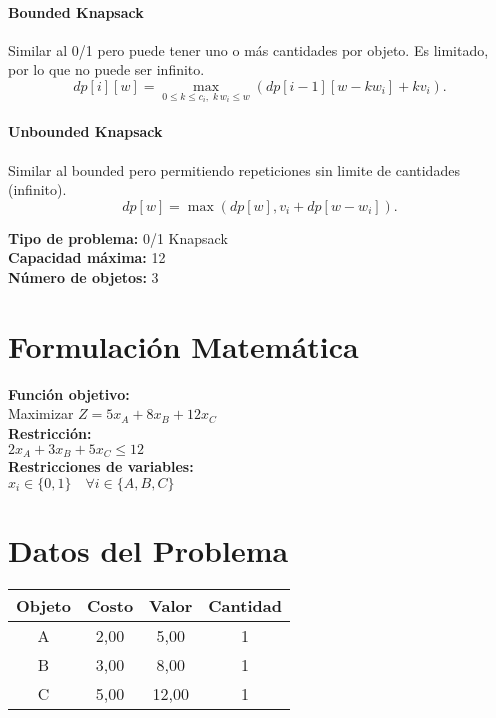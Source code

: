 \documentclass{article}
\begin{document}
\paragraph{Bounded Knapsack} Similar al 0/1 pero puede tener uno o más cantidades por objeto. Es limitado, por lo que no puede ser infinito. 
\[
dp[i][w] = 
\max_{0 \leq k \leq c_i,\; k\,w_i \leq w} \left( dp[i-1][w - k w_i] + k v_i \right).
\]

\paragraph{Unbounded Knapsack} Similar al bounded pero permitiendo repeticiones sin limite de cantidades (infinito).
\[
dp[w] = \max ( dp[w], v_i + dp[w - w_i] ).
\]

\thispagestyle{empty}
\newpage
\textbf{Tipo de problema:} 0/1 Knapsack\\
\textbf{Capacidad máxima:} 12\\
\textbf{Número de objetos:} 3\\

\section*{Formulación Matemática}
\textbf{Función objetivo:}\\
Maximizar $Z = 5 x_{A} + 8 x_{B} + 12 x_{C}$\\

\textbf{Restricción:}\\
$2 x_{A} + 3 x_{B} + 5 x_{C} \leq 12$\\

\textbf{Restricciones de variables:}\\
$x_i \in \{0, 1\} \quad \forall i \in \{A, B, C\}$\\
\vspace{0.5cm}

\section*{Datos del Problema}
\begin{tabular}{|c|c|c|c|}
\hline
Objeto & Costo & Valor & Cantidad \\
\hline
A & 2,00 & 5,00 & 1 \\
B & 3,00 & 8,00 & 1 \\
C & 5,00 & 12,00 & 1 \\
\hline
\end{tabular}
\end{document}
